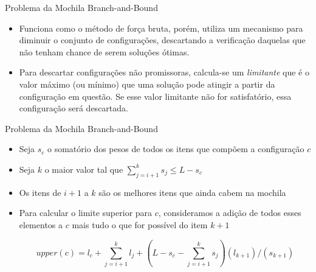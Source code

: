 \documentclass[slidestop,compress,mathserif]{beamer}
\begin{document}
\begin{frame} {Problema da Mochila} {Branch-and-Bound}

\begin{itemize}
\item Funciona como o método de força bruta, porém, utiliza um mecanismo para diminuir o conjunto de configurações, descartando a verificação daquelas que não tenham chance de serem soluções ótimas.

\item Para descartar configurações não promissoras, calcula-se um \textit{limitante} que é o valor máximo (ou mínimo) que uma solução pode atingir a partir da configuração em questão. Se esse valor limitante não for satisfatório, essa configuração será descartada.
\end{itemize}
\end{frame}







\begin{frame} {Problema da Mochila} {Branch-and-Bound}

\begin{itemize}
\item Seja $s_c$ o somatório dos pesos de todos os itens que compõem a configuração $c$
\item Seja $k$ o maior valor tal que $\sum_{j=i+1}^{k} s_j \leq L-s_c$
\item Os itens de $i+1$ a $k$ são os melhores itens que ainda cabem na mochila 
\item Para calcular o limite superior para $c$, consideramos a adição de todos esses elementos a $c$ mais tudo o que for possível do item $k+1$ 

\begin{equation}
 upper(c)= l_c+ \sum_{j=i+1}^{k} l_j + (L-s_c-\sum_{j=i+1}^{k} s_j) (l_{k+1})/(s_{k+1})
\end{equation} 


\end{itemize}

\end{frame}
\end{document}
